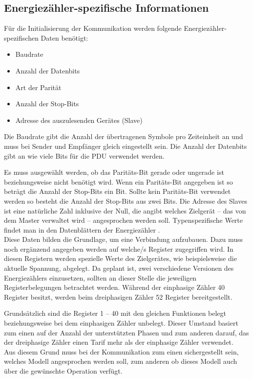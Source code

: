 \documentclass[Bachelorarbeit.tex]{subfiles}
\begin{document}
\newpage
\subsection{ Energiezähler-spezifische Informationen}
Für die Initialisierung der Kommunikation werden folgende Energiezähler-spezifischen Daten benötigt:
\begin{itemize}
\item Baudrate
\item Anzahl der Datenbits
\item Art der Parität
\item Anzahl der Stop-Bits
\item Adresse des auszulesenden Gerätes (Slave)
\end{itemize}
Die Baudrate gibt die Anzahl der übertragenen Symbole pro Zeiteinheit an und muss bei Sender und Empfänger gleich eingestellt sein. 
Die Anzahl der Datenbits gibt an wie viele Bits für die \ac{PDU} verwendet werden. 
\begin{comment}
Das Stop-bit gibt an ob ein oder zwei Stopbits verwendet werden. 
\end{comment}
Es muss ausgewählt werden, ob das Paritäts-Bit gerade oder ungerade ist beziehungsweise nicht benötigt wird. Wenn ein Paritäts-Bit angegeben ist so beträgt die Anzahl der Stop-Bits ein Bit.
Sollte kein Paritäts-Bit verwendet werden so besteht die Anzahl der Stop-Bits aus zwei Bits. 
Die Adresse des Slaves ist eine natürliche Zahl inklusive der Null, die angibt welches Zielgerät – das von dem Master verwaltet wird – angesprochen werden soll. 
Typenspezifische Werte findet man in den Datenblättern der Energiezähler \parencites[siehe:][]{datenblatt_ald1}[und][]{datenblatt_ale3}.\\
Diese Daten bilden die Grundlage, um eine Verbindung aufzubauen. 
Dazu  muss noch ergänzend angegeben werden auf welche/s Register zugegriffen wird.
In diesen Registern werden spezielle Werte des Zielgerätes, wie beispielsweise die aktuelle Spannung, abgelegt.
Da geplant ist, zwei verschiedene Versionen des Energiezählers einzusetzen, sollten an dieser Stelle die jeweiligen Registerbelegungen betrachtet werden. 
Während der einphasige Zähler 40 Register besitzt, werden beim dreiphasigen Zähler 52 Register bereitgestellt. 
\begin{comment}
Grundsätzlich sind die, bei beiden Zählern verwendeten Register, Register 1 – 40, mit den gleichen Funktionen belegt beziehungsweise bei den einphasigen Zähler unbelegt.
\end{comment}
Grundsätzlich sind die Register 1 – 40 mit den gleichen Funktionen belegt beziehungsweise bei dem einphasigen Zähler unbelegt.
Dieser Umstand basiert zum einen auf der Anzahl der unterstützten Phasen und zum anderen darauf, das der dreiphasige Zähler einen Tarif mehr als der einphasige Zähler verwendet.
\parencites[vgl:][]{datenblatt_ald1}[und][]{datenblatt_ale3} \\
Aus diesem Grund muss bei der Kommunikation zum einen sichergestellt sein, welches Modell angesprochen werden soll, zum anderen ob dieses Modell auch über die gewünschte Operation verfügt.
\end{document}
